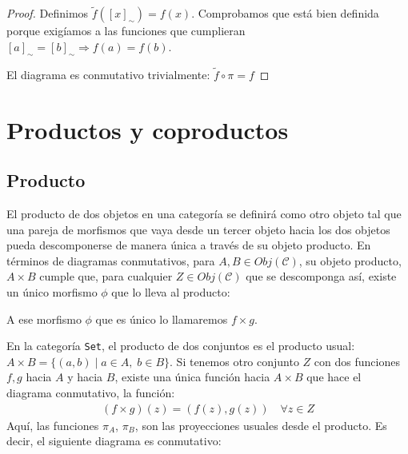 \documentclass[11pt, fleqn, spanish]{book}
\newcommand{\C}{\mathcal{C} }
\begin{document}
      \begin{proof}
	Definimos $\tilde f ([x]_\sim) = f(x)$. Comprobamos que está bien definida porque
	exigíamos a las funciones que cumplieran $[a]_{\sim} = [b]_{\sim} \Rightarrow f(a) = f(b)$.
	
	El diagrama es conmutativo trivialmente: $\tilde f \circ \pi = f$
      \end{proof} 
 

 \section {Productos y coproductos}
  \subsection{Producto}
    El producto de dos objetos en una categoría se definirá como otro objeto tal
    que una pareja de morfismos que vaya desde un tercer objeto hacia los dos objetos pueda descomponerse
    de manera única a través de su objeto producto.
    En términos de diagramas conmutativos, para $A,B \in Obj(\C)$, su objeto producto,
    $A \times B$ cumple que, para cualquier $Z \in Obj(\C)$ que se descomponga así,
    existe un único morfismo $\phi$ que lo lleva al producto:
    \begin{center}
    \end{center}
    A ese morfismo $\phi$ que es único lo llamaremos $f \times g$.
    
    \begin{example} 
      En la categoría \texttt{Set}, el producto de dos conjuntos es el producto
      usual: $A \times B = \{(a,b) \; | \; a \in A, \; b \in B \}$. Si tenemos otro conjunto $Z$
      con dos funciones $f,g$ hacia $A$ y hacia $B$, existe una única función hacia $A \times B$
      que hace el diagrama conmutativo, la función:
      \begin{gather*}
      (f \times g)(z) = (f(z),g(z)) \quad \forall z \in Z
      \end{gather*}
      Aquí, las funciones $\pi_A$, $\pi_B$, son las proyecciones usuales desde el producto.
      Es decir, el siguiente diagrama es conmutativo:
      \begin{center}
      \end{center}
    \end{example}
    
\end{document}
